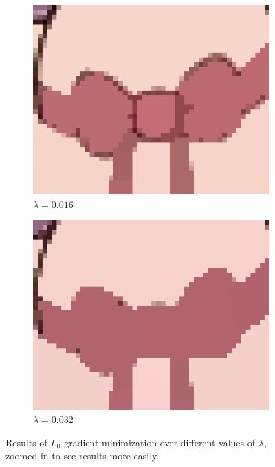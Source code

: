 \documentclass[10pt,twocolumn,letterpaper]{article}
\begin{document}
\begin{figure}
\begin{subfigure}{.48\linewidth}
\includegraphics[width=\linewidth]{gradminResults/gradmin_bow_large_0016.png}
\caption{$\lambda = 0.016$}
\end{subfigure}
\begin{subfigure}{.48\linewidth}
\includegraphics[width=\linewidth]{gradminResults/gradmin_bow_large_0032.png}
\caption{$\lambda = 0.032$}
\end{subfigure}
\caption{Results of $L_0$ gradient minimization over different values of $\lambda$, zoomed in to see results more easily.}
\label{fig:gradminResultsBow}
\end{figure}
\end{document}
